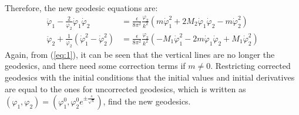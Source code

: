 \documentclass[fleqn]{article}
\begin{document}
Therefore, the new geodesic equations are:
\begin{align}[left=\empheqlbrace]
\label{eq:1}
\ddot  \varphi_{1} - \frac{2}{ \varphi_{2}}  \dot \varphi_{1} \dot \varphi_{2} & = \frac{\epsilon}{8\pi^{2}}\frac{\varphi_{2}}{k^{2}} (m\dot \varphi_{1} ^{2} + 2M_{2} \dot \varphi_{1} \dot \varphi_{2} - m \dot \varphi_{2}^{2}) \\
\label{eq:2}
\ddot \varphi_{2} + \frac{1}{\varphi_{2}} (\dot \varphi_{1} ^{2} - \dot \varphi_{2} ^{2}) & = \frac{\epsilon}{8\pi^{2}} \frac{\varphi_{2}}{k^{2}} (-M_{1} \dot \varphi_{1} ^{2} - 2m \dot \varphi_{1} \dot \varphi_{2} + M_{1} \dot \varphi_{2} ^{2})
\end{align}
Again, from (\ref{eq:1}), it can be seen that the vertical lines are no longer the geodesics, and there need some correction terms if $m \neq 0$. Restricting corrected geodesics with the initial conditions that the initial values and initial derivatives are equal to the ones for uncorrected geodesics, which is written as $(\varphi _{1}, \varphi_{2}) = (\varphi_{1} ^{0}, \varphi_{2} ^{0} e^{\pm \frac{s}{\sqrt{k}}})$, find the new geodesics.
\end{document}
